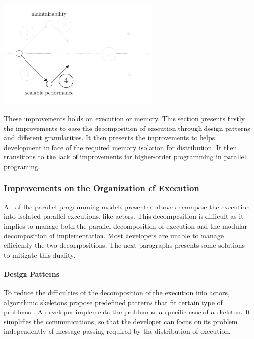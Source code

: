 \begin{center}
\includegraphics[width=0.6\textwidth]{../ressources/state-of-the-art-4.pdf}
\end{center}

These improvements holds on execution or memory.
This section presents firstly the improvements to ease the decomposition of execution through design patterns and different granularities.
It then presents the improvements to helps development in face of the required memory isolation for distribution.
It then transitions to the lack of improvements for higher-order programming in parallel programing.

\subsubsection{Improvements on the Organization of Execution}

All of the parallel programming models presented above decompose the execution into isolated parallel executions, like actors.
This decomposition is difficult as it implies to manage both the parallel decomposition of execution and the modular decomposition of implementation.
Most developers are unable to manage efficiently the two decompositions.
The next paragraphs presents some solutions to mitigate this duality.

\paragraph{Design Patterns}

To reduce the difficulties of the decomposition of the execution into actors, algorithmic skeletons propose predefined patterns that fit certain type of problems \cite{Cole1988, Dean2008, McCool2010, Gonzalez-Velez2010}.
A developer implements the problem as a specific case of a skeleton.
It simplifies the communications, so that the developer can focus on its problem independently of message passing required by the distribution of execution.

